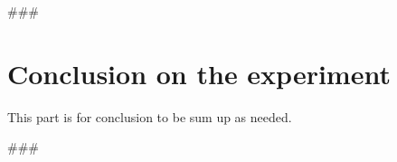
\usepackage{comment}




###

\section{Conclusion on the experiment}\label{sec:conclution}
This part is for conclusion to be sum up as needed.
\hfill\break
\hfill\break



###

\begin{comment}
Author = DIEGO MICCOLI
Alias = Kozen88
Organization = SWAP Research Group UniBa
Date = 27-12-2023

This mini template is not working by itself because there are latex command missing needed
to compile the file and give as output a pdf file, in addition it has been added jinja
statement in order to control the rendering of the latex file with the jinja library, for these
reasons it needs to be used with the other mini chunks in conjunction.
\end{comment}